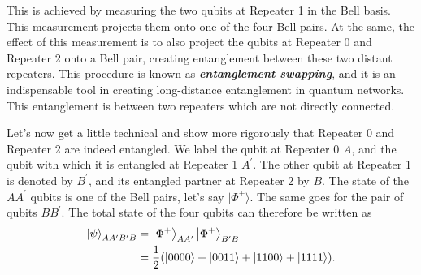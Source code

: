 This is achieved by measuring the two qubits at Repeater 1 in the Bell basis.
This measurement projects them onto one of the four Bell pairs.
At the same, the effect of this measurement is to also project the qubits at Repeater 0 and Repeater 2 onto a Bell pair, creating entanglement between these two distant repeaters.
This procedure is known as \emph{\textbf{entanglement swapping}}, and it is an indispensable tool in creating long-distance entanglement in quantum networks.
This entanglement is between two repeaters which are not directly connected.

Let's now get a little technical and show more rigorously that Repeater 0 and Repeater 2 are indeed entangled.
We label the qubit at Repeater 0 $A$, and the qubit with which it is entangled at Repeater 1 $A^{\prime}$.
The other qubit at Repeater 1 is denoted by $B^{\prime}$, and its entangled partner at Repeater 2 by $B$.
The state of the $AA^{\prime}$ qubits is one of the Bell pairs, let's say $|\Phi^+\rangle$.
The same goes for the pair of qubits $BB^{\prime}$.
The total state of the four qubits can therefore be written as
\begin{align}
    \begin{aligned}
        \left| \psi \right\rangle_{AA^{\prime}B^{\prime}B} & = \left| \Phi^{+} \right\rangle_{A A^{\prime}}\left| \Phi^{+} \right\rangle_{B^{\prime} B} \\
        & = \frac{1}{2} ( |0000\rangle+|0011\rangle+|1100\rangle+|1111\rangle ).
        \label{eq:12-3_computational_basis}
    \end{aligned}
\end{align}

